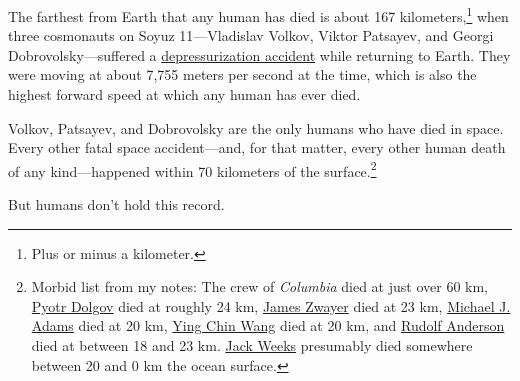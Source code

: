 {{The farthest from Earth that any human has died is about 167 kilometers,{\footnote{Plus or minus a kilometer.} } when three cosmonauts on Soyuz 11—Vladislav Volkov, Viktor Patsayev, and Georgi Dobrovolsky—suffered a \href{http://history.nasa.gov/SP-4209/ch8-2.htm}{depressurization accident} while returning to Earth. They were moving at about 7,755 meters per second at the time, which is also the highest forward speed at which any human has ever died.}

{Volkov, Patsayev, and Dobrovolsky are the only humans who have died in space. Every other fatal space accident—and, for that matter, every other human death of any kind—happened within 70 kilometers of the surface.{\footnote{Morbid list from my notes: The crew of \emph{Columbia} died at just over 60 km, \href{http://en.wikipedia.org/wiki/Pyotr\_Dolgov}{Pyotr Dolgov} died at roughly 24 km, \href{http://roadrunnersinternationale.com/weaver\_sr71\_bailout.html}{James Zwayer} died at 23 km, \href{http://en.wikipedia.org/wiki/Michael\_J.\_Adams}{Michael J. Adams} died at 20 km, \href{http://myplace.frontier.com/\~anneled/ColdWar.html}{Ying Chin Wang} died at 20 km, and \href{http://en.wikipedia.org/wiki/Rudolf\_Anderson}{Rudolf Anderson} died at between 18 and 23 km. \href{http://www.habu.org/a-12/06932.html}{Jack Weeks} presumably died somewhere between 20 and 0 km the ocean surface.} } }

{But humans don't hold this record.}

}
